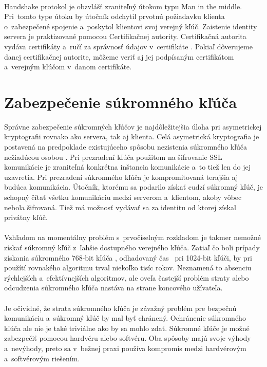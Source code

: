 \documentclass[
  digital, %
  table,   %
oneside,
  nolof,     %
  nolot,     %
]{fithesis3}
\begin{document}
\paragraph{}
Handshake protokol je obzvlášť zraniteľný  útokom typu Man in the middle. Pri~tomto type útoku by útočník odchytil prvotnú požiadavku klienta o~zabezpečené spojenie a~poskytol klientovi svoj verejný kľúč. Zaistenie identity servera je praktizované pomocou Certifikačnej autority.  Certifikačná autorita vydáva certifikáty a~ručí za správnosť údajov v~certifikáte \cite{certificateAuth}. Pokiaľ dôverujeme danej certifikačnej autorite, môžeme veriť aj jej podpísaným certifikátom  a~verejným kľúčom v~danom certifikáte. 
\section{Zabezpečenie súkromného kľúča }
Správne zabezpečenie súkromných kľúčov je najdôležitejšia úloha pri asymetrickej kryptografii rovnako ako servera, tak aj klienta. Celá asymetrická kryptografia je postavená na predpoklade existujúceho spôsobu nezistenia súkromného kľúča nežiadúcou osobou \cite{ssl}. Pri prezradení kľúča použitom na šifrovanie SSL komunikácie je zraniteľná konkrétna inštancia komunikácie a~to tiež len do jej uzavretia. Pri prezradení súkromného kľúča je kompromitovaná terajšia aj budúca komunikácia. Útočník, ktorému sa podarilo získať cudzí súkromný kľúč, je schopný čítať všetku komunikáciu medzi serverom a~klientom, akoby vôbec nebola šifrovaná. Tiež má možnosť vydávať sa za identitu od ktorej získal privátny kľúč.\paragraph{}
Vzhľadom na momentálny problém s~prvočíselným rozkladom je takmer nemožné získať súkromný kľúč z~ľahšie dostupného verejného kľúča. Zatiaľ čo boli prípady získania súkromného 768-bit kľúča \cite{crypt768}, odhadovaný čas~ pri 1024-bit kľúči, by pri  použítí rovnakého algoritmu trval niekoľko tisíc rokov. Neznamená to absenciu rýchlejších a~efektívnejších algoritmov, ale oveľa častejší problém straty alebo odcudzenia súkromného kľúča nastáva na strane koncového užívateľa.\paragraph{}
Je očividné, že strata súkromného kľúča je závažný problém pre bezpečnú komunikáciu a~súkromný kľúč by mal byť chránený. Ochránenie súkromného kľúča ale nie je také triviálne ako by sa mohlo zdať. Súkromné kľúče je možné zabezpečiť pomocou hardvéru alebo softvéru. Oba spôsoby majú svoje výhody a~nevýhody, preto sa  v~bežnej praxi používa kompromis medzi hardvérovým a~softvérovým riešením.
\end{document}

